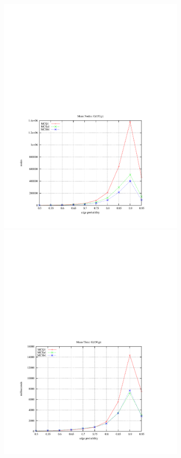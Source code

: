 \documentclass{l4proj}
\begin{document}
\begin{figure}
\begin{center}
\begin{minipage}[t]{0.49\textwidth}
\end{minipage}
\end{center}
\vspace{-6cm}
\begin{center}
\hspace{-1.5cm}
\begin{minipage}[t]{0.49\textwidth}
\includegraphics[height=11.5cm]{nds-150.pdf}
\end{minipage}
\hfill
\begin{minipage}[t]{0.49\textwidth}
\includegraphics[height=11.5cm]{time-150.pdf}

\end{minipage}
\end{center}
\end{figure}
\end{document}
